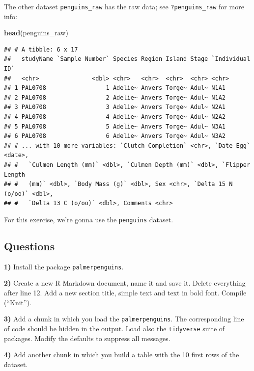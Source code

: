 \documentclass[
  12pt,
]{book}
\newenvironment{Shaded}{\begin{snugshade}}{\end{snugshade}}
\newcommand{\KeywordTok}[1]{\textcolor[rgb]{0.13,0.29,0.53}{\textbf{#1}}}
\newcommand{\NormalTok}[1]{#1}
\begin{document}
The other dataset \texttt{penguins\_raw} has the raw data; see \texttt{?penguins\_raw} for more info:

\begin{Shaded}
\begin{Highlighting}[]
\KeywordTok{head}\NormalTok{(penguins_raw)}
\end{Highlighting}
\end{Shaded}

\begin{verbatim}
## # A tibble: 6 x 17
##   studyName `Sample Number` Species Region Island Stage `Individual ID`
##   <chr>               <dbl> <chr>   <chr>  <chr>  <chr> <chr>          
## 1 PAL0708                 1 Adelie~ Anvers Torge~ Adul~ N1A1           
## 2 PAL0708                 2 Adelie~ Anvers Torge~ Adul~ N1A2           
## 3 PAL0708                 3 Adelie~ Anvers Torge~ Adul~ N2A1           
## 4 PAL0708                 4 Adelie~ Anvers Torge~ Adul~ N2A2           
## 5 PAL0708                 5 Adelie~ Anvers Torge~ Adul~ N3A1           
## 6 PAL0708                 6 Adelie~ Anvers Torge~ Adul~ N3A2           
## # ... with 10 more variables: `Clutch Completion` <chr>, `Date Egg` <date>,
## #   `Culmen Length (mm)` <dbl>, `Culmen Depth (mm)` <dbl>, `Flipper Length
## #   (mm)` <dbl>, `Body Mass (g)` <dbl>, Sex <chr>, `Delta 15 N (o/oo)` <dbl>,
## #   `Delta 13 C (o/oo)` <dbl>, Comments <chr>
\end{verbatim}

For this exercise, we're gonna use the \texttt{penguins} dataset.

\hypertarget{questions}{%
\subsection{Questions}\label{questions}}

\textbf{1)} Install the package \texttt{palmerpenguins}.

\textbf{2)} Create a new R Markdown document, name it and save it. Delete everything after line 12. Add a new section title, simple text and text in bold font. Compile (``Knit'').

\textbf{3)} Add a chunk in which you load the \texttt{palmerpenguins}. The corresponding line of code should be hidden in the output. Load also the \texttt{tidyverse} suite of packages. Modify the defaults to suppress all messages.

\textbf{4)} Add another chunk in which you build a table with the 10 first rows of the dataset.
\end{document}
